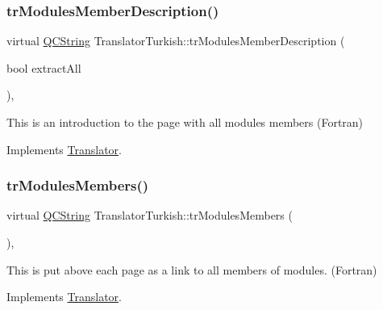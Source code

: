 \mbox{\label{class_translator_turkish_af290466ce59631fbbdec9bf03dd63113}} 
\subsubsection{\texorpdfstring{trModulesMemberDescription()}{trModulesMemberDescription()}}
{\footnotesize\ttfamily virtual \mbox{\hyperlink{class_q_c_string}{Q\+C\+String}} Translator\+Turkish\+::tr\+Modules\+Member\+Description (\begin{DoxyParamCaption}\item[{bool}]{extract\+All }\end{DoxyParamCaption})\hspace{0.3cm}{\ttfamily [inline]}, {\ttfamily [virtual]}}

This is an introduction to the page with all modules members (Fortran) 

Implements \mbox{\hyperlink{class_translator}{Translator}}.

\mbox{\label{class_translator_turkish_a5c4dcf6f39231299bc5a01271be63a49}} 
\subsubsection{\texorpdfstring{trModulesMembers()}{trModulesMembers()}}
{\footnotesize\ttfamily virtual \mbox{\hyperlink{class_q_c_string}{Q\+C\+String}} Translator\+Turkish\+::tr\+Modules\+Members (\begin{DoxyParamCaption}{ }\end{DoxyParamCaption})\hspace{0.3cm}{\ttfamily [inline]}, {\ttfamily [virtual]}}

This is put above each page as a link to all members of modules. (Fortran) 

Implements \mbox{\hyperlink{class_translator}{Translator}}.

\mbox{\label{class_translator_turkish_a738bfe6297abc9ae3773b7f78d17033f}} 
